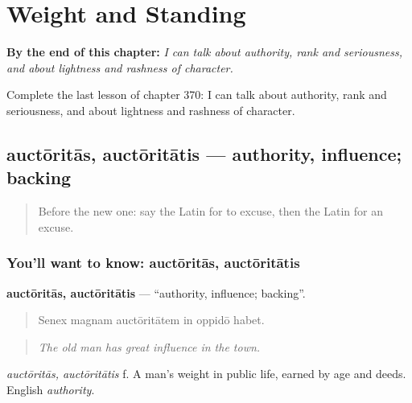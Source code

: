 
\chapter{Weight and Standing}
\label{ch:la-weight-and-standing}

\begin{chapteropening}
\textbf{By the end of this chapter:} \emph{I can talk about authority, rank and seriousness, and about lightness and rashness of character.}

Complete the last lesson of chapter 370: I can talk about authority, rank and seriousness, and about lightness and rashness of character.
\end{chapteropening}

\section[auctōritās, auctōritātis]{auctōritās, auctōritātis — authority, influence; backing}

\label{lesson:LA-C370-auctoritas}



\begin{quote}
Before the new one: say the Latin for to excuse, then the Latin for an excuse.
\end{quote}

\subsection*{You'll want to know: auctōritās, auctōritātis}
\textbf{auctōritās, auctōritātis} — \textquotedblleft{}authority, influence; backing\textquotedblright{}.

\begin{quote}
Senex magnam auctōritātem in oppidō habet.
\end{quote}

\begin{quote}
\emph{The old man has great influence in the town.}
\end{quote}

\emph{auctōritās, auctōritātis} f. A man's weight in public life, earned by age and deeds. English \emph{authority}.


